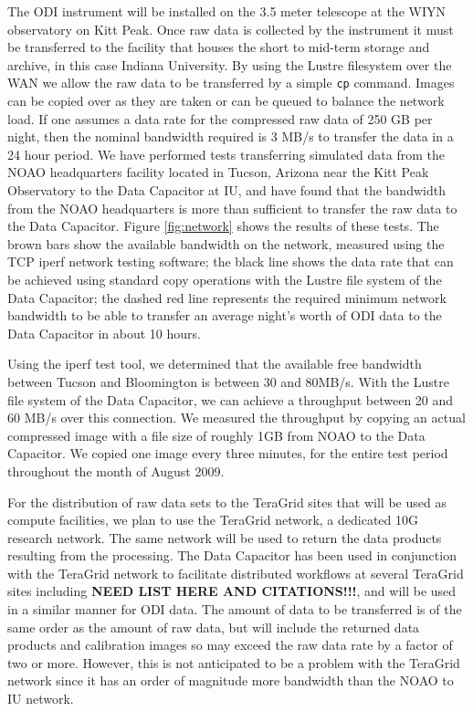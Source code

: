 \documentclass[10pt,conference]{IEEEtran}
\begin{document}
The ODI instrument will be installed on the 3.5 meter telescope at the WIYN observatory on Kitt Peak. Once raw data is collected by the instrument it must be transferred to the facility that houses the short to mid-term storage and archive, in this case Indiana University. By using the Lustre filesystem over the WAN we allow the raw data to be transferred by a simple {\tt cp} command. Images can be copied over as they are taken or can be queued to balance the network load. If one assumes a data rate for the compressed raw data of 250 GB per night, then the nominal bandwidth required is 3 MB/s to transfer the data in a 24 hour period. We have performed tests transferring simulated data from the NOAO headquarters facility located in Tucson, Arizona near the Kitt Peak Observatory to the Data Capacitor at IU, and have found that the bandwidth from the NOAO headquarters is more than sufficient to transfer the raw data to the Data Capacitor. Figure \ref{fig:network} shows the results of these tests. The brown bars show the available bandwidth on the network, measured using the TCP iperf network testing software; the black line shows the data rate that can be achieved using standard copy operations with the Lustre file system of the Data Capacitor; the dashed red line represents the required
minimum network bandwidth to be able to transfer an average night's worth of ODI data to
the Data Capacitor in about 10 hours.

Using the iperf test tool, we determined that the available free bandwidth between Tucson
and Bloomington is between 30 and 80MB/s. With the Lustre file system of the Data Capacitor,
we can achieve a throughput between 20 and 60 MB/s over this connection. We measured
the throughput by copying an actual compressed image with a file size of roughly 1GB from NOAO to
the Data Capacitor. We copied one image every three minutes, for the entire test period throughout the month of August 2009.

For the distribution of raw data sets to the TeraGrid sites that will be used as compute facilities, we plan to use the TeraGrid network, a dedicated 10G research network. The same network will be used to return the data products resulting from the processing. The Data Capacitor has been used in conjunction with the TeraGrid network to facilitate distributed workflows at several TeraGrid sites including {\bf NEED LIST HERE AND CITATIONS!!!}, and will be used in a similar manner for ODI data. The amount of data to be transferred is of the same order as the amount of raw data, but will include the returned data products and calibration images so may exceed the raw data rate by a factor of two or more. However, this is not anticipated to be a problem with the TeraGrid network since it has an order of magnitude more bandwidth than the NOAO to IU network.
\end{document}
